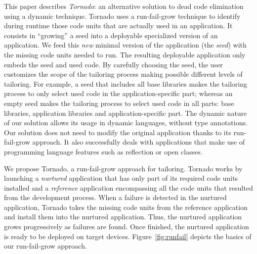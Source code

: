 This paper describes \emph{Tornado}: an alternative solution to dead code elimination using a dynamic technique.
Tornado uses a run-fail-grow technique to identify during runtime those code units that are actually used in an application.
It consists in ``growing'' a seed into a deployable specialized version of an application. 
We feed this \emph{new} minimal version of the application (the \emph{seed}) with the missing code units needed to run.
The resulting deployable application only embeds the seed and used code.
By carefully choosing the seed, the user customizes the scope of the tailoring process making possible different levels of tailoring.
For example, a seed that includes all base libraries makes the tailoring process to only select used code in the application-specific part; whereas an empty seed makes the tailoring process to select used code in all parts: base libraries, application libraries and application-specific part.
The dynamic nature of our solution allows its usage in dynamic languages, without type annotations. Our solution does not need to modify the original application thanks to its run-fail-grow approach.
It also successfully deals with applications that make use of programming language features such as reflection or open classes.


We propose Tornado, a run-fail-grow approach for tailoring. Tornado works by launching a \emph{nurtured} application that has only part of its required code units installed and a \emph{reference} application encompassing all the code units that resulted from the development process. When a failure is detected in the nurtured application, Tornado takes the missing code units from the reference application and install them into the nurtured application. Thus, the nurtured application grows progressively as failures are found.
Once finished, the nurtured application is ready to be deployed on target devices. Figure~\ref{fig:runfail} depicts the basics of our run-fail-grow approach.


